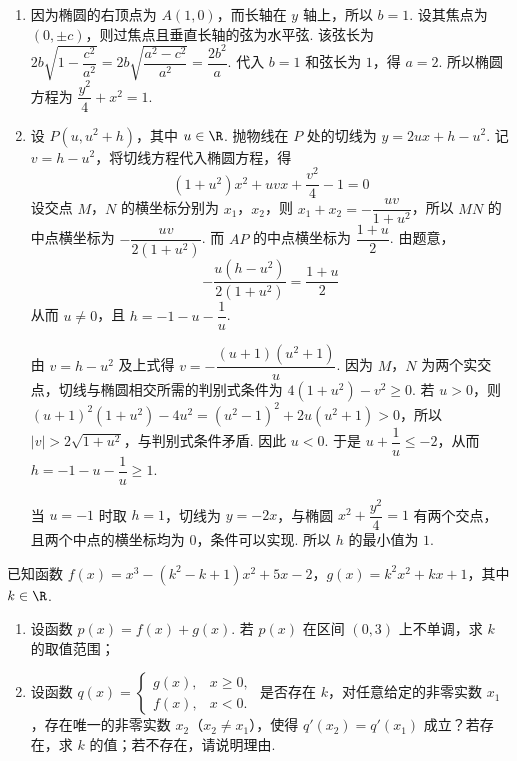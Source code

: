 \begin{solution}
\begin{enumerate}
\item 因为椭圆的右顶点为 \(A(1,0)\)，而长轴在 \(y\) 轴上，所以 \(b=1\). 设其焦点为 \((0,\pm c)\)，则过焦点且垂直长轴的弦为水平弦. 该弦长为
\(2b\sqrt{1-\dfrac{c^2}{a^2}}=2b\sqrt{\dfrac{a^2-c^2}{a^2}}=\dfrac{2b^2}{a}\). 代入 \(b=1\) 和弦长为 \(1\)，得 \(a=2\). 所以椭圆方程为 \(\dfrac{y^2}{4}+x^2=1\).
\item 设 \(P(u,u^2+h)\)，其中 \(u\in\R\). 抛物线在 \(P\) 处的切线为
\(y=2ux+h-u^2\). 记 \(v=h-u^2\)，将切线方程代入椭圆方程，得
\[
(1+u^2)x^2+uvx+\frac{v^2}{4}-1=0
\]
设交点 \(M\)，\(N\) 的横坐标分别为 \(x_1\)，\(x_2\)，则
\(x_1+x_2=-\dfrac{uv}{1+u^2}\)，所以 \(MN\) 的中点横坐标为 \(-\dfrac{uv}{2(1+u^2)}\). 而 \(AP\) 的中点横坐标为 \(\dfrac{1+u}{2}\). 由题意，
\[
-\frac{u(h-u^2)}{2(1+u^2)}=\frac{1+u}{2}
\]
从而 \(u\neq0\)，且
\(h=-1-u-\dfrac1u\).

由 \(v=h-u^2\) 及上式得 \(v=-\dfrac{(u+1)(u^2+1)}{u}\). 因为 \(M\)，\(N\) 为两个实交点，切线与椭圆相交所需的判别式条件为 \(4(1+u^2)-v^2\geqslant0\).
若 \(u>0\)，则
\((u+1)^2(1+u^2)-4u^2=(u^2-1)^2+2u(u^2+1)>0\)，所以 \(|v|>2\sqrt{1+u^2}\)，与判别式条件矛盾. 因此 \(u<0\). 于是
\(u+\dfrac1u\leqslant-2\)，从而 \(h=-1-u-\dfrac1u\geqslant1\).

当 \(u=-1\) 时取 \(h=1\)，切线为 \(y=-2x\)，与椭圆 \(x^2+\dfrac{y^2}{4}=1\) 有两个交点，且两个中点的横坐标均为 \(0\)，条件可以实现. 所以 \(h\) 的最小值为 \(1\).
\end{enumerate}
\end{solution}

\begin{problem}
已知函数 \(f(x)=x^3-(k^2-k+1)x^2+5x-2\)，\(g(x)=k^2x^2+kx+1\)，其中 \(k\in\R\).
\begin{enumerate}
\item 设函数 \(p(x)=f(x)+g(x)\). 若 \(p(x)\) 在区间 \((0,3)\) 上不单调，求 \(k\) 的取值范围；
\item 设函数 \(q(x)=\begin{cases}
g(x), & x\geqslant 0,\\
f(x), & x<0.
\end{cases}\) 是否存在 \(k\)，对任意给定的非零实数 \(x_1\)，存在唯一的非零实数 \(x_2\)（\(x_2\neq x_1\)），使得 \(q'(x_2)=q'(x_1)\) 成立？若存在，求 \(k\) 的值；若不存在，请说明理由.
\end{enumerate}
\end{problem}

